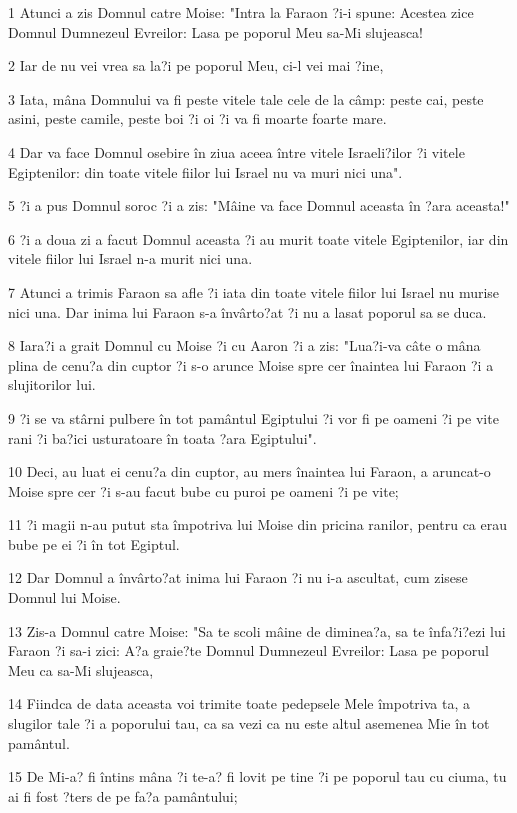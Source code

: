 \par 1 Atunci a zis Domnul catre Moise: "Intra la Faraon ?i-i spune: Acestea zice Domnul Dumnezeul Evreilor: Lasa pe poporul Meu sa-Mi slujeasca!
\par 2 Iar de nu vei vrea sa la?i pe poporul Meu, ci-l vei mai ?ine,
\par 3 Iata, mâna Domnului va fi peste vitele tale cele de la câmp: peste cai, peste asini, peste camile, peste boi ?i oi ?i va fi moarte foarte mare.
\par 4 Dar va face Domnul osebire în ziua aceea între vitele Israeli?ilor ?i vitele Egiptenilor: din toate vitele fiilor lui Israel nu va muri nici una".
\par 5 ?i a pus Domnul soroc ?i a zis: "Mâine va face Domnul aceasta în ?ara aceasta!"
\par 6 ?i a doua zi a facut Domnul aceasta ?i au murit toate vitele Egiptenilor, iar din vitele fiilor lui Israel n-a murit nici una.
\par 7 Atunci a trimis Faraon sa afle ?i iata din toate vitele fiilor lui Israel nu murise nici una. Dar inima lui Faraon s-a învârto?at ?i nu a lasat poporul sa se duca.
\par 8 Iara?i a grait Domnul cu Moise ?i cu Aaron ?i a zis: "Lua?i-va câte o mâna plina de cenu?a din cuptor ?i s-o arunce Moise spre cer înaintea lui Faraon ?i a slujitorilor lui.
\par 9 ?i se va stârni pulbere în tot pamântul Egiptului ?i vor fi pe oameni ?i pe vite rani ?i ba?ici usturatoare în toata ?ara Egiptului".
\par 10 Deci, au luat ei cenu?a din cuptor, au mers înaintea lui Faraon, a aruncat-o Moise spre cer ?i s-au facut bube cu puroi pe oameni ?i pe vite;
\par 11 ?i magii n-au putut sta împotriva lui Moise din pricina ranilor, pentru ca erau bube pe ei ?i în tot Egiptul.
\par 12 Dar Domnul a învârto?at inima lui Faraon ?i nu i-a ascultat, cum zisese Domnul lui Moise.
\par 13 Zis-a Domnul catre Moise: "Sa te scoli mâine de diminea?a, sa te înfa?i?ezi lui Faraon ?i sa-i zici: A?a graie?te Domnul Dumnezeul Evreilor: Lasa pe poporul Meu ca sa-Mi slujeasca,
\par 14 Fiindca de data aceasta voi trimite toate pedepsele Mele împotriva ta, a slugilor tale ?i a poporului tau, ca sa vezi ca nu este altul asemenea Mie în tot pamântul.
\par 15 De Mi-a? fi întins mâna ?i te-a? fi lovit pe tine ?i pe poporul tau cu ciuma, tu ai fi fost ?ters de pe fa?a pamântului;
